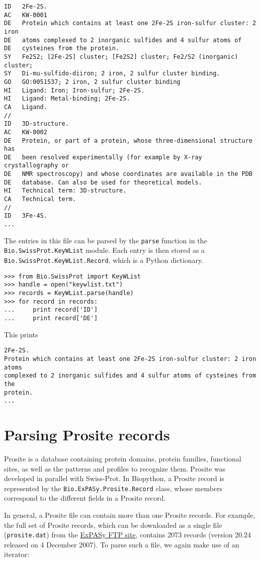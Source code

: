\documentclass{report}
\begin{document}
\begin{verbatim}
ID   2Fe-2S.
AC   KW-0001
DE   Protein which contains at least one 2Fe-2S iron-sulfur cluster: 2 iron
DE   atoms complexed to 2 inorganic sulfides and 4 sulfur atoms of
DE   cysteines from the protein.
SY   Fe2S2; [2Fe-2S] cluster; [Fe2S2] cluster; Fe2/S2 (inorganic) cluster;
SY   Di-mu-sulfido-diiron; 2 iron, 2 sulfur cluster binding.
GO   GO:0051537; 2 iron, 2 sulfur cluster binding
HI   Ligand: Iron; Iron-sulfur; 2Fe-2S.
HI   Ligand: Metal-binding; 2Fe-2S.
CA   Ligand.
//
ID   3D-structure.
AC   KW-0002
DE   Protein, or part of a protein, whose three-dimensional structure has
DE   been resolved experimentally (for example by X-ray crystallography or
DE   NMR spectroscopy) and whose coordinates are available in the PDB
DE   database. Can also be used for theoretical models.
HI   Technical term: 3D-structure.
CA   Technical term.
//
ID   3Fe-4S.
...
\end{verbatim}

The entries in this file can be parsed by the \verb+parse+ function in the \verb+Bio.SwissProt.KeyWList+ module. Each entry is then stored as a \verb+Bio.SwissProt.KeyWList.Record+, which is a Python dictionary.

\begin{verbatim}
>>> from Bio.SwissProt import KeyWList
>>> handle = open("keywlist.txt")
>>> records = KeyWList.parse(handle)
>>> for record in records:
...     print record['ID']
...     print record['DE']
\end{verbatim}

This prints
\begin{verbatim}
2Fe-2S.
Protein which contains at least one 2Fe-2S iron-sulfur cluster: 2 iron atoms
complexed to 2 inorganic sulfides and 4 sulfur atoms of cysteines from the
protein.
...
\end{verbatim}

\section{Parsing Prosite records}

Prosite is a database containing protein domains, protein families, functional sites, as well as the patterns and profiles to recognize them. Prosite was developed in parallel with Swiss-Prot. In Biopython, a Prosite record is represented by the \verb|Bio.ExPASy.Prosite.Record| class, whose members correspond to the different fields in a Prosite record.

In general, a Prosite file can contain more than one Prosite records. For example, the full set of Prosite records, which can be downloaded as a single file (\verb|prosite.dat|) from the \href{ftp://ftp.expasy.org/databases/prosite/prosite.dat}{ExPASy FTP site}, contains 2073 records (version 20.24 released on 4 December 2007). To parse such a file, we again make use of an iterator:
\end{document}
